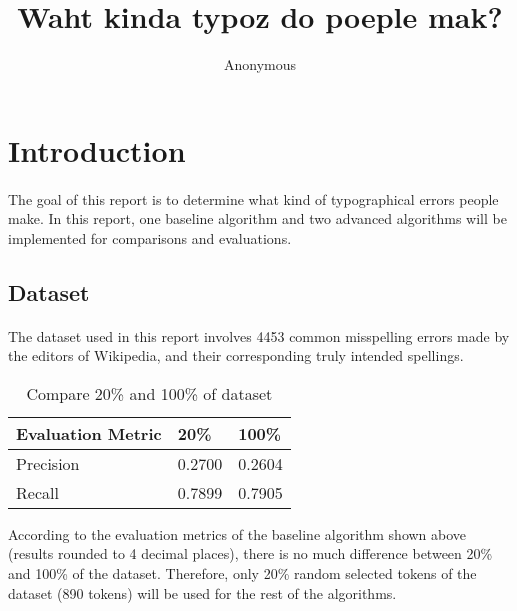 \documentclass[11pt]{article}
\title{Waht kinda typoz do poeple mak?}
\author
{Anonymous}
\begin{document}
\maketitle

\section{Introduction}

\paragraph{} The goal of this report is to determine what kind of typographical errors people make. In this report, one baseline algorithm and two advanced algorithms will be implemented for comparisons and evaluations.

\subsection{Dataset}

\paragraph{} The dataset used in this report involves 4453 common misspelling errors made by the editors of Wikipedia\cite{WikiMisspell}, and their corresponding truly intended spellings.

\begin{table}[h]
 \begin{center}
\begin{tabular}{| l | l | l |}

      \hline
      Evaluation Metric & 20\% & 100\% \\
      \hline\hline
      Precision & 0.2700 & 0.2604 \\
      Recall & 0.7899 & 0.7905 \\
      \hline

\end{tabular}
\caption{Compare 20\% and 100\% of dataset}\label{table1}
 \end{center}
\end{table}

According to the evaluation metrics of the baseline algorithm shown above (results rounded to 4 decimal places), there is no much difference between 20\% and 100\% of the dataset. Therefore, only 20\% random selected tokens of the dataset (890 tokens) will be used for the rest of the algorithms.
\end{document}
